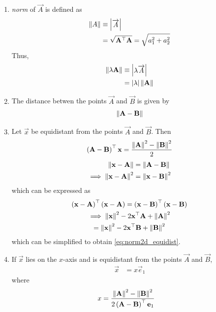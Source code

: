 \documentclass[journal,12pt,onecolumn]{IEEEtran}
\renewcommand\thesection{\arabic{section}}
\renewcommand\thesubsection{\thesection.\arabic{subsection}}
\begin{document}
\begin{enumerate}[label=\thesubsection.\arabic*.,ref=\thesubsection.\theenumi]
%
\item {\em norm} of $\vec{A}$ is defined as
\begin{align}
  \label{eq:norm2d}
  \left\lVert A\right\rVert &\equiv \begin{vmatrix}\overrightarrow{A}\end{vmatrix}
  \\
  &= \sqrt{\mathbf{A}^{\top} \mathbf{A}}= \sqrt{a_1^2+a_2^2}
\end{align}
Thus, 
\begin{align}
  \label{eq:norm2d_const}
  \left\lVert\lambda \mathbf{A}\right\rVert &\equiv \begin{vmatrix}\lambda\overrightarrow{A}\end{vmatrix}
  \\
  &= \left\vert\lambda\right\vert \left\lVert\mathbf{A}\right\rVert
\end{align}
\item The distance betwen the points $\vec{A}$ and $\vec{B}$ is given by 
\begin{align}
  \label{eq:norm2d_dist}
\left\lVert\mathbf{A}-\mathbf{B}\right\rVert 
\end{align}
\item Let $\vec{x}$ be equidistant from the points $\vec{A}$ and $\vec{B}$.  Then 
  \begin{align}
	  \left(\mathbf{A}-\mathbf{B}\right)^{\top}{\mathbf{x}} 
	  =  \frac{\left\lVert\mathbf{A}\right\rVert^2 - \left\lVert\mathbf{B}\right\rVert^2}{2}
  \label{eq:norm2d_equidist}
  \end{align}
  \solution 
\begin{align}
	\left\lVert\mathbf{x}-\mathbf{A}\right\rVert &=
\left\lVert\mathbf{A}-\mathbf{B}\right\rVert 
\\
	\implies \left\lVert\mathbf{x}-\mathbf{A}\right\rVert^2 &=
\left\lVert\mathbf{x}-\mathbf{B}\right\rVert^2 
\end{align}
which can be expressed as 
\begin{multline}
	\left(\mathbf{x}-\mathbf{A}\right)^{\top} \left(\mathbf{x}-\mathbf{A}\right)=
	\left(\mathbf{x}-\mathbf{B}\right)^{\top} 
\left(\mathbf{x}-\mathbf{B}\right)
\\
	\implies	\left\lVert\mathbf{x}\right\rVert^2-2{\mathbf{x}}^{\top}\mathbf{A} + \left\lVert\mathbf{A}\right\rVert^2
	\\= \left\lVert\mathbf{x}\right\rVert^2-2{\mathbf{x}}^{\top}\mathbf{B} + \left\lVert\mathbf{B}\right\rVert^2
\end{multline}
which can be simplified to obtain
  \eqref{eq:norm2d_equidist}.
\item If $\vec{x}$ lies on the  $x$-axis and is  equidistant from the points $\vec{A}$ and $\vec{B}$, 
  \begin{align}
	  \vec{x} &=
	   x\vec{e}_1
  \end{align}
  where 
  \begin{align}
	  x &=\frac{\left\lVert\mathbf{A}\right\rVert^2 -\left\lVert\mathbf{B}\right\rVert^2 }{2\left(\mathbf{A}-\mathbf{B}\right)^{\top }\mathbf{e}_1
}
	  \label{eq:cbse_10_x}
  \end{align}

\end{enumerate}
\end{document}
